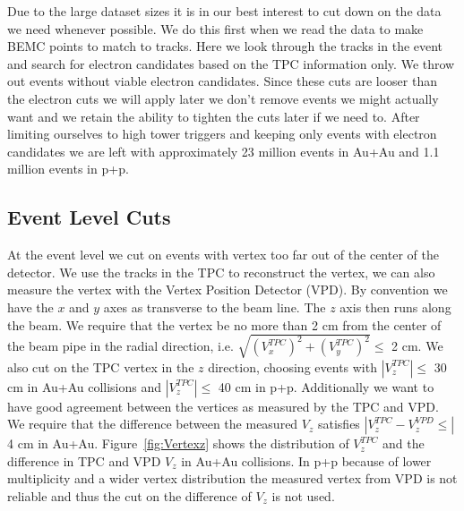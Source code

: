 Due to the large dataset sizes it is in our best interest to cut down on the data we need whenever possible. We do this first when we read the data to make BEMC points to match to tracks. Here we look through the tracks in the event and search for electron candidates based on the TPC information only. We throw out events without viable electron candidates. Since these cuts are looser than the electron cuts we will apply later we don't remove events we might actually want and we retain the ability to tighten the cuts later if we need to. After limiting ourselves to high tower triggers and keeping only events with electron candidates we are left with approximately 23 million events in Au+Au and 1.1 million events in p+p.

\subsection{Event Level Cuts}

At the event level we cut on events with vertex too far out of the center of the detector. We use the tracks in the TPC to reconstruct the vertex, we can also measure the vertex with the Vertex Position Detector (VPD). By convention we have the $x$ and $y$ axes as transverse to the beam line. The $z$ axis then runs along the beam. We require that the vertex be no more than 2 cm from the center of the beam pipe in the radial direction, i.e. $\sqrt{(V_x^{TPC})^2 + (V_y^{TPC})^2} \leq$ 2 cm. We also cut on the TPC vertex in the $z$ direction, choosing events with $|V_z^{TPC}| \leq$ 30 cm in Au+Au collisions and $|V_z^{TPC}| \leq$ 40 cm in p+p. Additionally we want to have good agreement between the vertices as measured by the TPC and VPD. We require that the difference between the measured $V_z$ satisfies $|V_z^{TPC} - V_z^{VPD} \leq|$ 4 cm in Au+Au. Figure~\ref{fig:Vertexz} shows the distribution of $V_z^{TPC}$ and the difference in TPC and VPD $V_z$ in Au+Au collisions. In p+p because of lower multiplicity and a wider vertex distribution the measured vertex from VPD is not reliable and thus the cut on the difference of $V_z$ is not used.

